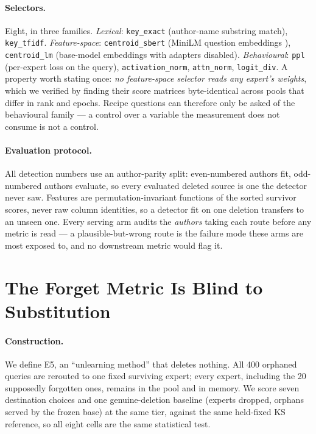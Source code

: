 \documentclass[11pt]{article}
\begin{document}
\paragraph{Selectors.} Eight, in three families.
\emph{Lexical}: \texttt{key\_exact} (author-name substring match), \texttt{key\_tfidf}.
\emph{Feature-space}: \texttt{centroid\_sbert} (MiniLM question embeddings
\citep{reimers2019sbert}), \texttt{centroid\_lm} (base-model embeddings with adapters disabled).
\emph{Behavioural}: \texttt{ppl} (per-expert loss on the query), \texttt{activation\_norm},
\texttt{attn\_norm}, \texttt{logit\_div}.
A property worth stating once: \emph{no feature-space selector reads any expert's weights}, which we
verified by finding their score matrices byte-identical across pools that differ in rank and
epochs. Recipe questions can therefore only be asked of the behavioural family --- a control over a
variable the measurement does not consume is not a control.

\paragraph{Evaluation protocol.} All detection numbers use an author-parity split: even-numbered
authors fit, odd-numbered authors evaluate, so every evaluated deleted source is one the detector
never saw. Features are permutation-invariant functions of the sorted survivor scores, never raw
column identities, so a detector fit on one deletion transfers to an unseen one. Every serving arm
audits the \emph{authors} taking each route before any metric is read --- a plausible-but-wrong route
is the failure mode these arms are most exposed to, and no downstream metric would flag it.

\section{The Forget Metric Is Blind to Substitution}
\label{sec:blind}

\paragraph{Construction.} We define E5, an ``unlearning method'' that deletes nothing. All 400
orphaned queries are rerouted to one fixed surviving expert; every expert, including the 20
supposedly forgotten ones, remains in the pool and in memory. We score seven destination choices and
one genuine-deletion baseline (experts dropped, orphans served by the frozen base) at the same tier,
against the same held-fixed KS reference, so all eight cells are the same statistical test.
\end{document}
